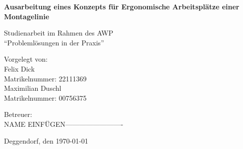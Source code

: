 \documentclass[12pt, a4paper]{article}
\begin{document}

\begin{titlepage}
    \centering
    
    
    \vspace{2cm}
    
    {\Huge\bfseries Ausarbeitung eines Konzepts für Ergonomische Arbeitsplätze einer Montagelinie\par}
    
    \vspace{1cm}
    
    {\Large Studienarbeit im Rahmen des AWP \\
    \enquote{Problemlösungen in der Praxis}\par}
    
    \vspace{2cm}
    
    {\large
    Vorgelegt von: \\
    \vspace{0.2cm}
    Felix Dick \\ 
    Matrikelnummer: 22111369\\ 
    Maximilian Duschl \\ 
    Matrikelnummer: 00756375\\
    \vspace{1.5cm}
    
    Betreuer: \\
    NAME EINFÜGEN------------------------- \par} %
    
    \vfill %
    
    {\large Deggendorf, den \today\par}

\end{titlepage}



\thispagestyle{empty}

\newpage

\tableofcontents
\newpage










\newpage
\printbibliography[title={References}]
\end{document}
